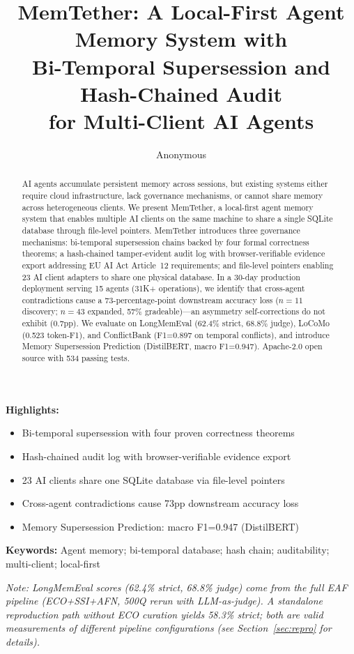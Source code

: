 \documentclass[11pt]{article}
\title{MemTether: A Local-First Agent Memory System with\\
       Bi-Temporal Supersession and Hash-Chained Audit\\
       for Multi-Client AI Agents}
\author{Anonymous}
\date{}
\begin{document}
\maketitle

\begin{abstract}
AI agents accumulate persistent memory across sessions, but existing systems either require cloud infrastructure, lack governance mechanisms, or cannot share memory across heterogeneous clients. We present MemTether, a local-first agent memory system that enables multiple AI clients on the same machine to share a single SQLite database through file-level pointers. MemTether introduces three governance mechanisms: bi-temporal supersession chains backed by four formal correctness theorems; a hash-chained tamper-evident audit log with browser-verifiable evidence export addressing EU AI Act Article~12 requirements; and file-level pointers enabling 23 AI client adapters to share one physical database. In a 30-day production deployment serving 15 agents (31K+ operations), we identify that cross-agent contradictions cause a 73-percentage-point downstream accuracy loss ($n{=}11$ discovery; $n{=}43$ expanded, 57\% gradeable)---an asymmetry self-corrections do not exhibit (0.7pp). We evaluate on LongMemEval (62.4\% strict, 68.8\% judge), LoCoMo (0.523 token-F1), and ConflictBank (F1=0.897 on temporal conflicts), and introduce Memory Supersession Prediction (DistilBERT, macro F1=0.947). Apache-2.0 open source with 534 passing tests.
\end{abstract}

\noindent\textbf{Highlights:}
\begin{itemize}
\item Bi-temporal supersession with four proven correctness theorems
\item Hash-chained audit log with browser-verifiable evidence export
\item 23 AI clients share one SQLite database via file-level pointers
\item Cross-agent contradictions cause 73pp downstream accuracy loss
\item Memory Supersession Prediction: macro F1=0.947 (DistilBERT)
\end{itemize}

\noindent\textbf{Keywords:} Agent memory; bi-temporal database; hash chain; auditability; multi-client; local-first

\noindent\textit{Note: LongMemEval scores (62.4\% strict, 68.8\% judge) come from the full EAF pipeline (ECO+SSI+AFN, 500Q rerun with LLM-as-judge). A standalone reproduction path without ECO curation yields 58.3\% strict; both are valid measurements of different pipeline configurations (see Section~\ref{sec:repro} for details).}
\end{document}

